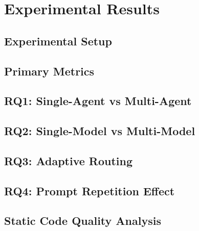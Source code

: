 \section{Experimental Results}


\subsection{Experimental Setup}

\subsection{Primary Metrics}

\subsection{RQ1: Single-Agent vs Multi-Agent}

\subsection{RQ2: Single-Model vs Multi-Model}

\subsection{RQ3: Adaptive Routing}

\subsection{RQ4: Prompt Repetition Effect}

\subsection{Static Code Quality Analysis}
